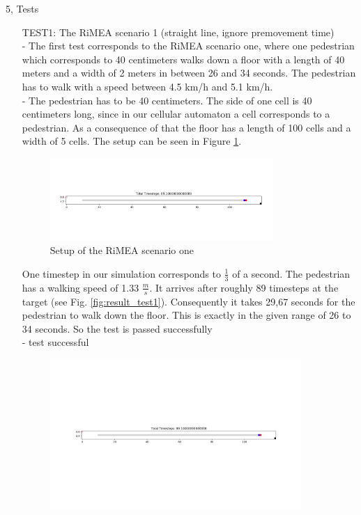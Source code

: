 \documentclass[10pt,a4paper]{article}
\begin{document}
\begin{task}{5, Tests}
\begin{enumerate}
\item[TEST1:] The RiMEA scenario 1 (straight line, ignore premovement time)\\
- The first test corresponds to the RiMEA scenario one, where one pedestrian which corresponds to 40 centimeters walks down a floor with a length of 40 meters and a width of 2 meters in between 26 and 34 seconds. The pedestrian has to walk with a speed between 4.5 km/h and 5.1 km/h. \\
- The pedestrian has to be 40 centimeters. The side of one cell is 40 centimeters long, since in our cellular automaton a cell corresponds to a pedestrian. As a consequence of that the floor has a length of 100 cells and a width of 5 cells. The setup can be seen in Figure \ref{fig:setup_test1}.
\begin{figure}[H]
    \centering
    \includegraphics[width=0.8\textwidth]{pictures/Test1start.png}
    \caption{Setup of the RiMEA scenario one}
    \label{fig:setup_test1}
\end{figure}
One timestep in our simulation corresponds to $\frac{1}{3}$ of a second. The pedestrian has a walking speed of 1.33 $\frac{m}{s}$. It arrives after roughly 89 timesteps at the target (see Fig. \ref{fig:result_test1}). Consequently it takes 29,67 seconds for the pedestrian to walk down the floor. This is exactly in the given range of 26 to 34 seconds. So the test is passed successfully \\
- test successful
\begin{figure}[H]
    \centering
    \includegraphics[width=0.9\textwidth]{pictures/test1_end.png}

\end{figure}
\end{enumerate}
\end{task}
\end{document}
